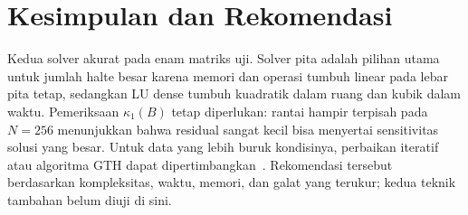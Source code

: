 \section{Kesimpulan dan Rekomendasi}
Kedua solver akurat pada enam matriks uji. Solver pita adalah pilihan utama untuk jumlah halte besar karena memori dan operasi tumbuh linear pada lebar pita tetap, sedangkan LU dense tumbuh kuadratik dalam ruang dan kubik dalam waktu. Pemeriksaan $\kappa_1(B)$ tetap diperlukan: rantai hampir terpisah pada $N=256$ menunjukkan bahwa residual sangat kecil bisa menyertai sensitivitas solusi yang besar. Untuk data yang lebih buruk kondisinya, perbaikan iteratif atau algoritma GTH dapat dipertimbangkan~\cite{gth,higham}. Rekomendasi tersebut berdasarkan kompleksitas, waktu, memori, dan galat yang terukur; kedua teknik tambahan belum diuji di sini.
